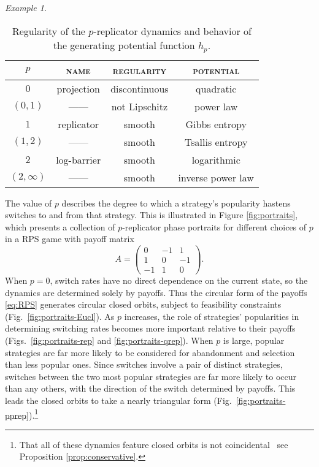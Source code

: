 \documentclass[reqno]{amsart}
\theoremstyle{plain}
\theoremstyle{definition}
\theoremstyle{remark}
\newtheorem{example}[theorem]{Example}
\numberwithin{equation}{section}
\numberwithin{theorem}{section}
\begin{document}
\begin{example}
\begin{table}[tbp]
\centering

\small
\begin{tabular}{cccc}
\hline
\noalign{\vspace{1pt}}
$p $ 
	&\textsc{name}
	&\textsc{regularity}
	&\textsc{potential}
	\\
\hline
\hline
$0$ &projection
	&discontinuous
	&quadratic
	\\
\hline
$(0,1)$
	&------
	&not Lipschitz
	&power law
	\\
\hline
$1$	
	&replicator
	&smooth
	&Gibbs entropy
	\\
\hline
$(1,2)$
	&------
	&smooth
	&Tsallis entropy
	\\
	\hline
$2$
	&log-barrier	
	&smooth
	&logarithmic
	\\
\hline
$(2,\infty)$
	&------
	&smooth
	&inverse power law
	\\
\hline
\end{tabular}
\vspace{2ex}
\caption{\small
Regularity of the $p$-replicator dynamics and behavior of the generating potential function $h_p$.
}
\label{tab:pReplicator}
\end{table}

The value of $p$ describes the degree to which a strategy's popularity hastens switches to and from that strategy.
This is illustrated in Figure \ref{fig:portraits}, which presents a collection of $p$-replicator phase portraits for different choices of $p$ in a \acl{RPS} game with payoff matrix
\begin{equation}
\label{eq:RPS}
A =
	\left(
	\begin{array}{ccc}
	0	& -1	& 1
	\\
	1	& 0	& -1
	\\
	-1	& 1	& 0
	\end{array}
	\right).
\end{equation}
When $p = 0$, switch rates have no direct dependence on the current state, so the dynamics are determined solely by payoffs.
Thus the circular form of the payoffs \eqref{eq:RPS} generates circular closed orbits, subject to feasibility constraints (Fig.~\ref{fig:portraits-Eucl}).
As $p$ increases, the role of strategies' popularities in determining switching rates becomes more important relative to their payoffs (Figs.~\ref{fig:portraits-rep} and \ref{fig:portraits-qrep}).
When $p$ is large, popular strategies are far more likely to be considered for abandonment and selection than less popular ones.
Since switches involve a pair of distinct strategies, switches between the two most popular strategies are far more likely to occur than any others, with the direction of the switch determined by payoffs.
This leads the closed orbits to take a nearly triangular form (Fig.~\ref{fig:portraits-pprep}).\footnote{That all of these dynamics feature closed orbits is not coincidental \textendash\ see Proposition \ref{prop:conservative}.}
\end{example}
\end{document}
